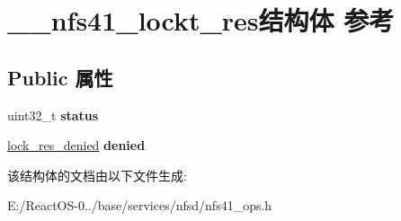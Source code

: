 \hypertarget{struct____nfs41__lockt__res}{}\section{\+\_\+\+\_\+nfs41\+\_\+lockt\+\_\+res结构体 参考}
\label{struct____nfs41__lockt__res}
\subsection*{Public 属性}
\begin{DoxyCompactItemize}
\item 
\mbox{\label{struct____nfs41__lockt__res_a77b03e0fd9392c2557b97bee09999e77}} 
uint32\+\_\+t {\bfseries status}
\item 
\mbox{\label{struct____nfs41__lockt__res_a66986eaada91c57c9036ec92ddaaac58}} 
\hyperlink{struct____lock__res__denied}{lock\+\_\+res\+\_\+denied} {\bfseries denied}
\end{DoxyCompactItemize}


该结构体的文档由以下文件生成\+:\begin{DoxyCompactItemize}
\item 
E\+:/\+React\+O\+S-\/0../base/services/nfsd/nfs41\+\_\+ops.\+h\end{DoxyCompactItemize}
